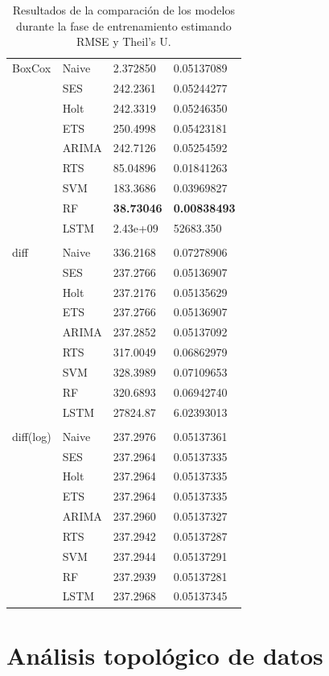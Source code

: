 \begin{table}
\begin{adjustbox}{width=0.83\textwidth}
\begin{tabular}{m{5cm} m{3.5cm} m{3cm} m{3cm} }
		BoxCox	&Naive & 2.372850  & 0.05137089\\
		&SES   & 242.2361  & 0.05244277\\
		&Holt  & 242.3319  & 0.05246350\\
		&ETS   & 250.4998  & 0.05423181\\
		&ARIMA & 242.7126 & 0.05254592\\
		&RTS   & 85.04896   & 0.01841263\\
		&SVM   & 183.3686   & 0.03969827\\
		&RF    & \textbf{38.73046}   & \textbf{0.00838493}\\
		&LSTM  & 2.43e+09  & 52683.350\\ \\
		diff		&Naive & 336.2168  	& 0.07278906\\
		&SES   & 237.2766  	& 0.05136907\\
		&Holt  & 237.2176  	& 0.05135629\\
		&ETS   & 237.2766 	& 0.05136907\\
		&ARIMA & 237.2852  	& 0.05137092\\
		&RTS   & 317.0049   & 0.06862979\\
		&SVM   & 328.3989   & 0.07109653\\
		&RF    & 320.6893	& 0.06942740\\
		&LSTM  & 27824.87  	& 6.02393013\\ \\
		diff(log)	&Naive & 237.2976  	& 0.05137361\\
		&SES   & 237.2964  	& 0.05137335\\
		&Holt  & 237.2964  	& 0.05137335\\
		&ETS   & 237.2964  	& 0.05137335\\
		&ARIMA & 237.2960 	& 0.05137327\\
		&RTS   & 237.2942  	& 0.05137287\\
		&SVM   & 237.2944  	& 0.05137291\\
		&RF    & 237.2939  	& 0.05137281\\
		&LSTM  & 237.2968	& 0.05137345\\
		\bottomrule
		\hline
	\end{tabular}
	\end{adjustbox}
	\caption{Resultados de la comparación de los modelos durante la fase de entrenamiento estimando RMSE y Theil’s U.}
	\label{tab:Table4}
\end{table}  
\section{Análisis topológico de datos}


